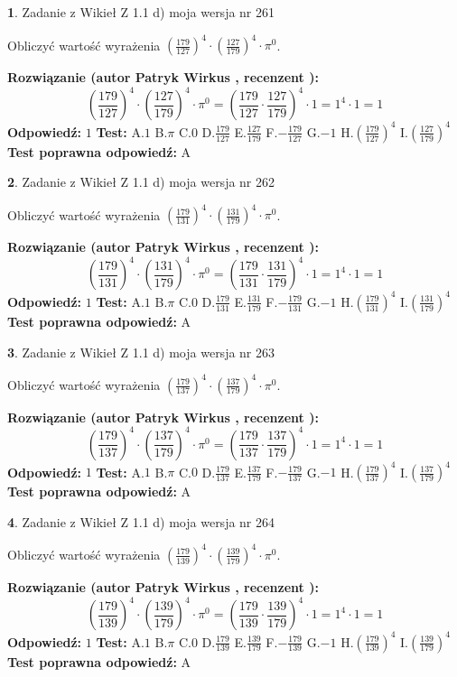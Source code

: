 \documentclass[12pt, a4paper]{article}
\theoremstyle{definition} %
\newtheorem{zad}{}
\newcommand{\zadStart}[1]{\begin{zad}#1\newline}
\newcommand{\zadStop}{\end{zad}}
\newcommand{\rozwStart}[2]{\noindent \textbf{Rozwiązanie (autor #1 , recenzent #2): }\newline}
\newcommand{\rozwStop}{\newline}
\newcommand{\odpStart}{\noindent \textbf{Odpowiedź:}\newline}
\newcommand{\odpStop}{\newline}
\newcommand{\testStart}{\noindent \textbf{Test:}\newline}
\newcommand{\testStop}{\newline}
\newcommand{\kluczStart}{\noindent \textbf{Test poprawna odpowiedź:}\newline}
\newcommand{\kluczStop}{\newline}
\begin{document}
\zadStart{Zadanie z Wikieł Z 1.1 d) moja wersja nr 261}

Obliczyć wartość wyrażenia $(\frac{179}{127})^{4} \cdot (\frac{127}{179})^{4} \cdot \pi^{0}$.
\zadStop
\rozwStart{Patryk Wirkus}{}
$$(\frac{179}{127})^{4} \cdot (\frac{127}{179})^{4} \cdot \pi^{0} = (\frac{179}{127} \cdot \frac{127}{179})^{4} \cdot 1 = 1^{4} \cdot 1 = 1$$
\rozwStop
\odpStart
$1$
\odpStop
\testStart
A.$1$ B.$\pi$ C.$0$ D.$\frac{179}{127}$ E.$\frac{127}{179}$
F.$-\frac{179}{127}$ G.$-1$
H.$(\frac{179}{127})^{4}$
I.$(\frac{127}{179})^{4}$
\testStop
\kluczStart
A
\kluczStop



\zadStart{Zadanie z Wikieł Z 1.1 d) moja wersja nr 262}

Obliczyć wartość wyrażenia $(\frac{179}{131})^{4} \cdot (\frac{131}{179})^{4} \cdot \pi^{0}$.
\zadStop
\rozwStart{Patryk Wirkus}{}
$$(\frac{179}{131})^{4} \cdot (\frac{131}{179})^{4} \cdot \pi^{0} = (\frac{179}{131} \cdot \frac{131}{179})^{4} \cdot 1 = 1^{4} \cdot 1 = 1$$
\rozwStop
\odpStart
$1$
\odpStop
\testStart
A.$1$ B.$\pi$ C.$0$ D.$\frac{179}{131}$ E.$\frac{131}{179}$
F.$-\frac{179}{131}$ G.$-1$
H.$(\frac{179}{131})^{4}$
I.$(\frac{131}{179})^{4}$
\testStop
\kluczStart
A
\kluczStop



\zadStart{Zadanie z Wikieł Z 1.1 d) moja wersja nr 263}

Obliczyć wartość wyrażenia $(\frac{179}{137})^{4} \cdot (\frac{137}{179})^{4} \cdot \pi^{0}$.
\zadStop
\rozwStart{Patryk Wirkus}{}
$$(\frac{179}{137})^{4} \cdot (\frac{137}{179})^{4} \cdot \pi^{0} = (\frac{179}{137} \cdot \frac{137}{179})^{4} \cdot 1 = 1^{4} \cdot 1 = 1$$
\rozwStop
\odpStart
$1$
\odpStop
\testStart
A.$1$ B.$\pi$ C.$0$ D.$\frac{179}{137}$ E.$\frac{137}{179}$
F.$-\frac{179}{137}$ G.$-1$
H.$(\frac{179}{137})^{4}$
I.$(\frac{137}{179})^{4}$
\testStop
\kluczStart
A
\kluczStop



\zadStart{Zadanie z Wikieł Z 1.1 d) moja wersja nr 264}

Obliczyć wartość wyrażenia $(\frac{179}{139})^{4} \cdot (\frac{139}{179})^{4} \cdot \pi^{0}$.
\zadStop
\rozwStart{Patryk Wirkus}{}
$$(\frac{179}{139})^{4} \cdot (\frac{139}{179})^{4} \cdot \pi^{0} = (\frac{179}{139} \cdot \frac{139}{179})^{4} \cdot 1 = 1^{4} \cdot 1 = 1$$
\rozwStop
\odpStart
$1$
\odpStop
\testStart
A.$1$ B.$\pi$ C.$0$ D.$\frac{179}{139}$ E.$\frac{139}{179}$
F.$-\frac{179}{139}$ G.$-1$
H.$(\frac{179}{139})^{4}$
I.$(\frac{139}{179})^{4}$
\testStop
\kluczStart
A
\kluczStop
\end{document}

